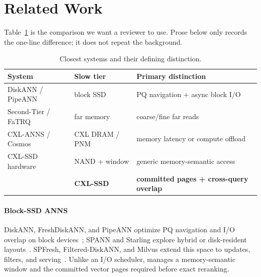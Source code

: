 \section{Related Work}
\label{sec:related}

Table~\ref{tab:related} is the comparison we want a reviewer to use.
Prose below only records the one-line difference; it does not repeat the background.

\begin{table}[t]
  \caption{Closest systems and their defining distinction.}
  \label{tab:related}
  \scriptsize
  \setlength{\tabcolsep}{2.5pt}
  \begin{tabular}{@{}p{}p{}p{}@{}}
    \toprule
    System & Slow tier & Primary distinction \\
    \midrule
    DiskANN / PipeANN & block SSD & PQ navigation + async block I/O \\
    Second-Tier / FaTRQ & far memory & coarse/fine far reads \\
    CXL-ANNS / Cosmos & CXL DRAM / PNM & memory latency or compute offload \\
    CXL-SSD hardware & NAND + window & generic memory-semantic access \\
    \textbf{\sys{}} & \textbf{CXL-SSD} & \textbf{committed pages + cross-query overlap} \\
    \bottomrule
  \end{tabular}
\end{table}

\paragraph{Block-SSD ANNS}
DiskANN, FreshDiskANN, and PipeANN optimize PQ navigation and I/O overlap on block devices~\cite{diskann,freshdiskann,pipeann}; SPANN and Starling explore hybrid or disk-resident layouts~\cite{spann,starling}.
SPFresh, Filtered-DiskANN, and Milvus extend this space to updates, filters, and serving~\cite{spfresh,filtereddiskann,milvus}.
Unlike an I/O scheduler, \sys{} manages a memory-semantic window and the committed vector pages required before exact reranking.


